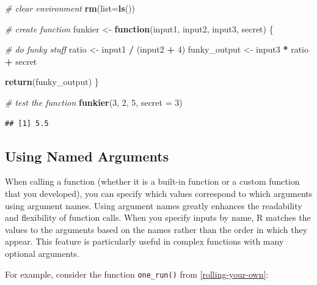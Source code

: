 \documentclass[
]{book}
\newenvironment{Shaded}{\begin{snugshade}}{\end{snugshade}}
\newcommand{\AttributeTok}[1]{\textcolor[rgb]{0.13,0.29,0.53}{#1}}
\newcommand{\CommentTok}[1]{\textcolor[rgb]{0.56,0.35,0.01}{\textit{#1}}}
\newcommand{\ControlFlowTok}[1]{\textcolor[rgb]{0.13,0.29,0.53}{\textbf{#1}}}
\newcommand{\DecValTok}[1]{\textcolor[rgb]{0.00,0.00,0.81}{#1}}
\newcommand{\FunctionTok}[1]{\textcolor[rgb]{0.13,0.29,0.53}{\textbf{#1}}}
\newcommand{\NormalTok}[1]{#1}
\newcommand{\OtherTok}[1]{\textcolor[rgb]{0.56,0.35,0.01}{#1}}
\newcommand{\SpecialCharTok}[1]{\textcolor[rgb]{0.81,0.36,0.00}{\textbf{#1}}}
\begin{document}
\begin{Shaded}
\begin{Highlighting}[]
\CommentTok{\# clear environment}
\FunctionTok{rm}\NormalTok{(}\AttributeTok{list=}\FunctionTok{ls}\NormalTok{()) }

\CommentTok{\# create function}
\NormalTok{funkier }\OtherTok{\textless{}{-}} \ControlFlowTok{function}\NormalTok{(input1, input2, input3, secret) \{}
  
  \CommentTok{\# do funky stuff}
\NormalTok{  ratio }\OtherTok{\textless{}{-}}\NormalTok{ input1 }\SpecialCharTok{/}\NormalTok{ (input2 }\SpecialCharTok{+} \DecValTok{4}\NormalTok{)}
\NormalTok{  funky\_output }\OtherTok{\textless{}{-}}\NormalTok{ input3 }\SpecialCharTok{*}\NormalTok{ ratio }\SpecialCharTok{+}\NormalTok{ secret}
  
  \FunctionTok{return}\NormalTok{(funky\_output)  }
\NormalTok{\}}


\CommentTok{\# test the function}
\FunctionTok{funkier}\NormalTok{(}\DecValTok{3}\NormalTok{, }\DecValTok{2}\NormalTok{, }\DecValTok{5}\NormalTok{, }\AttributeTok{secret =} \DecValTok{3}\NormalTok{)}
\end{Highlighting}
\end{Shaded}

\begin{verbatim}
## [1] 5.5
\end{verbatim}

\subsection{Using Named Arguments}\label{using-named-arguments}

When calling a function (whether it is a built-in function or a custom function that you developed), you can specify which values correspond to which arguments using argument names.
Using argument names greatly enhances the readability and flexibility of function calls.
When you specify inputs by name, R matches the values to the arguments based on the names rather than the order in which they appear.
This feature is particularly useful in complex functions with many optional arguments.

For example, consider the function \texttt{one\_run()} from \ref{rolling-your-own}:

\begin{Shaded}
\end{Shaded}
\end{document}
